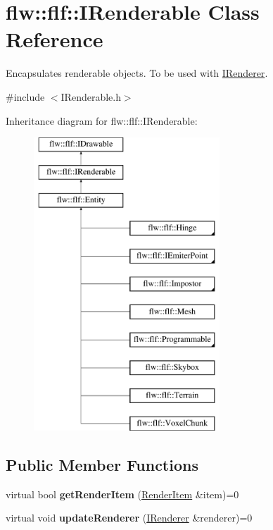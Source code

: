 \hypertarget{classflw_1_1flf_1_1IRenderable}{}\section{flw\+:\+:flf\+:\+:I\+Renderable Class Reference}
\label{classflw_1_1flf_1_1IRenderable}


Encapsulates renderable objects. To be used with \hyperlink{classflw_1_1flf_1_1IRenderer}{I\+Renderer}.  




{\ttfamily \#include $<$I\+Renderable.\+h$>$}

Inheritance diagram for flw\+:\+:flf\+:\+:I\+Renderable\+:\begin{figure}[H]
\begin{center}
\leavevmode
\includegraphics[height=11.000000cm]{classflw_1_1flf_1_1IRenderable}
\end{center}
\end{figure}
\subsection*{Public Member Functions}
\begin{DoxyCompactItemize}
\item 
virtual bool {\bfseries get\+Render\+Item} (\hyperlink{structflw_1_1flf_1_1RenderItem}{Render\+Item} \&item)=0\hypertarget{classflw_1_1flf_1_1IRenderable_a6605511b25801afe480d6c98af0394c8}{}\label{classflw_1_1flf_1_1IRenderable_a6605511b25801afe480d6c98af0394c8}

\item 
virtual void {\bfseries update\+Renderer} (\hyperlink{classflw_1_1flf_1_1IRenderer}{I\+Renderer} \&renderer)=0\hypertarget{classflw_1_1flf_1_1IRenderable_af31d698aaefd2171ce2efa1356c1e795}{}\label{classflw_1_1flf_1_1IRenderable_af31d698aaefd2171ce2efa1356c1e795}

\end{DoxyCompactItemize}


